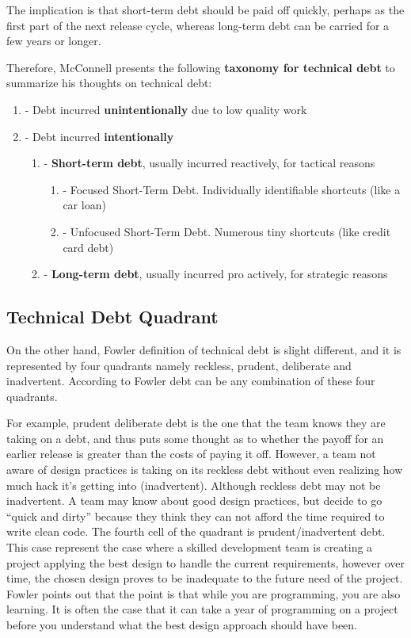 The implication is that short-term debt should be paid off quickly, perhaps as the first part of the next release cycle, whereas long-term debt can be carried for a few years or longer.

Therefore, McConnell presents the following \textbf{taxonomy for technical debt} to summarize his thoughts on technical debt:

\begin{enumerate}
    \item - Debt incurred \textbf{unintentionally} due to low quality work
    \item - Debt incurred \textbf{intentionally}
    \begin{enumerate}
        \item - \textbf{Short-term debt}, usually incurred reactively, for tactical reasons
        \begin{enumerate}
            \item - Focused Short-Term Debt. Individually identifiable shortcuts (like a car loan)
            \item - Unfocused Short-Term Debt. Numerous tiny shortcuts (like credit card debt)
        \end{enumerate}
        \item - \textbf{Long-term debt}, usually incurred pro actively, for strategic reasons
    \end{enumerate}
\end{enumerate}

\subsection{Technical Debt Quadrant}
\label{chap2:fowler_subsection}

On the other hand, Fowler definition of technical debt is slight different, and it is represented by four quadrants namely reckless, prudent, deliberate and inadvertent. According to Fowler debt can be any combination of these four quadrants. 

For example, prudent deliberate debt is the one that the team knows they are taking on a debt, and thus puts some thought as to whether the payoff for an earlier release is greater than the costs of paying it off. However, a team not aware of design practices is taking on its reckless debt without even realizing how much hack it's getting into (inadvertent). Although reckless debt may not be inadvertent. A team may know about good design practices, but decide to go ``quick and dirty'' because they think they can not afford the time required to write clean code. The fourth cell of the quadrant is prudent/inadvertent debt. This case represent the case where a skilled development team is creating a project applying the best design to handle the current requirements, however over time, the chosen design proves to be inadequate to the future need of the project. Fowler points out that the point is that while you are programming, you are also learning. It is often the case that it can take a year of programming on a project before you understand what the best design approach should have been.  

